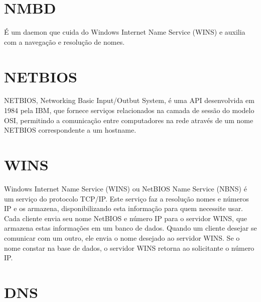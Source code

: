 \section{NMBD}

É um daemon que cuida do Windows Internet Name Service (WINS) e auxilia com a navegação e resolução de nomes.

\section{NETBIOS}

NETBIOS, Networking Basic Input/Outbut System, é uma API desenvolvida em 1984 pela IBM, que fornece serviços relacionados na camada de sessão do modelo OSI, permitindo a comunicação entre computadores na rede através de um nome NETBIOS correspondente a um hostname.

% 
% 

\section{WINS}

Windows Internet Name Service (WINS) ou NetBIOS Name Service (NBNS) é um serviço do protocolo TCP/IP. Este serviço faz a resolução nomes e números IP e os armazena, disponibilizando esta informação para quem necessite usar. Cada cliente envia seu nome NetBIOS e número IP para o servidor WINS, que armazena estas informações em um banco de dados. Quando um cliente desejar se comunicar com um outro, ele envia o nome desejado ao servidor WINS. Se o nome constar na base de dados, o servidor WINS retorna ao solicitante o número IP.

\section{DNS}

